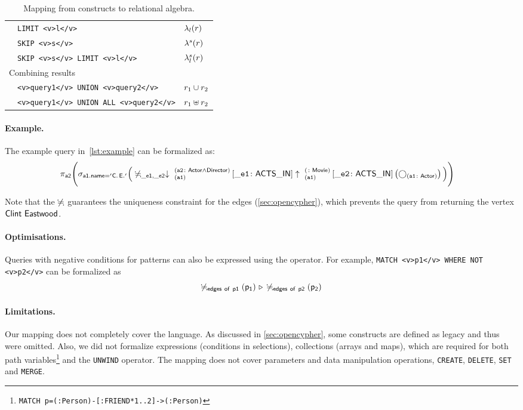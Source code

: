 \begin{table}[htbp]
\begin{tabular}{|l|l|l|}
		& \lstinline+LIMIT <v>l</v>+ & $\lambda_{l}(r)$ \\ \cline{2-3}

		& \lstinline+SKIP <v>s</v>+ & $\lambda^{s}(r)$ \\ \cline{2-3}
		
		& \lstinline+SKIP <v>s</v> LIMIT <v>l</v>+ & $\lambda_{l}^{s}(r)$ \\ \cline{2-3}
		
		\hline \multicolumn{3}{|l|}{Combining results } \\ \cline{2-3}
		
		& \lstinline+<v>query1</v> UNION <v>query2</v>+ & $r_1 \cup r_2$ \\ \cline{2-3}

		& \lstinline+<v>query1</v> UNION ALL <v>query2</v>+ & $r_1 \uplus r_2$ \\ \hline
	\end{tabular}
	\caption{Mapping from \opencypher constructs to relational algebra.}
	\label{table:mapping}
\end{table}

\paragraph{Example.} The example query in~\cref{lst:example} can be formalized as:
{\footnotesize
	\begin{align*}
	&\projection{a2} \Bigg(\selection{a1.name = 'C.\,E.'} \Big( \alldifferent{\_e1, \_e2} \expandin{a1}{a2}{Actor \land Director}{\_e1}{ACTS\_IN}{1}{1} \expandout{a1}{}{Movie}{\_e2}{ACTS\_IN}{1}{1} \left(\getvertices{a1}{Actor}\right) \Big) \Bigg)
	\end{align*}
}

Note that the $\not\fallingdotseq$ guarantees the uniqueness constraint for the edges (\cref{sec:opencypher}), which prevents the query from returning the vertex $\mathsf{Clint~Eastwood}$.

\paragraph{Optimisations.} Queries with negative conditions for patterns can also be expressed using the \antijointext operator. For example, \lstinline+MATCH <v>p1</v> WHERE NOT <v>p2</v>+ can be formalized as
$$\not\fallingdotseq_{\mathsf{\mathsf{edges~of~p1}}} \left(\mathsf{p_1}\right) \, \triangleright \, \not\fallingdotseq_{\mathsf{\mathsf{edges~of~p2}}} \left(\mathsf{p_2}\right)$$

\paragraph{Limitations.} Our mapping does not completely cover the \opencypher language. As discussed in \cref{sec:opencypher}, some constructs are defined as legacy and thus were omitted. Also, we did not formalize expressions (\eg  conditions in selections), collections (arrays and maps), which are required for both path variables\footnote{\lstinline+MATCH p=(:Person)-[:FRIEND*1..2]->(:Person)+} and the \lstinline+UNWIND+ operator. The mapping does not cover parameters and data manipulation operations, \eg \lstinline+CREATE+, \lstinline+DELETE+, \lstinline+SET+ and \lstinline+MERGE+.
